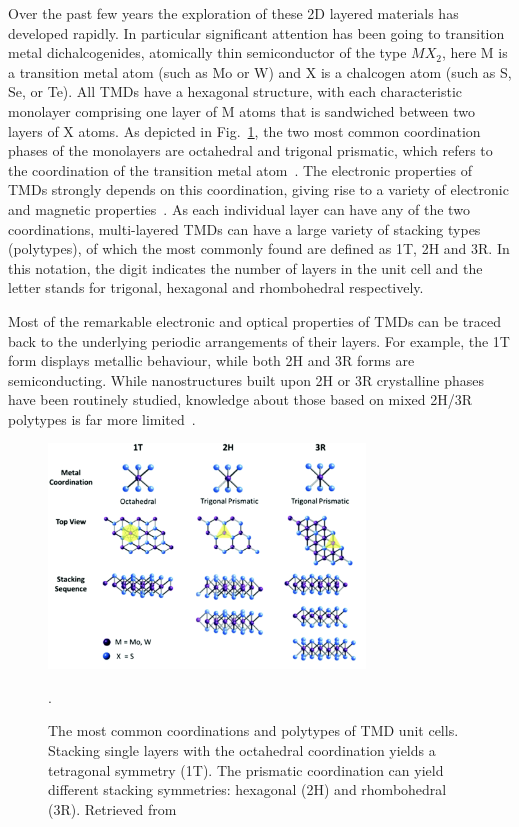 Over the past few years the exploration of these 2D layered materials
 has developed rapidly. 
 In particular significant attention has been 
 going to transition metal dichalcogenides,
 atomically thin semiconductor of the type $MX_2$, here M is a 
transition metal atom (such as Mo or W) and X is a chalcogen atom (such as S, Se, or Te). 
All TMDs have a hexagonal structure,
with each characteristic monolayer comprising one layer of M atoms 
that is sandwiched between two layers of X atoms.
%
As depicted in Fig.~\ref{fig:stackingtypes}, the two most common coordination phases of the monolayers 
are octahedral and trigonal prismatic, which refers to the coordination of the transition metal atom~\cite{Toh:2017}.
%
The electronic properties of TMDs strongly depends on this coordination,
giving rise to a variety of electronic
 and magnetic properties~\cite{Chhowalla:2013}.
As each individual layer can have any of the two coordinations, 
multi-layered TMDs can have a large variety of stacking types (polytypes), 
of which the most commonly found are defined as 1T, 2H and 3R.
%
In this notation, the digit indicates the number of layers in the unit cell and the
letter stands for trigonal, hexagonal and rhombohedral respectively.

Most of the remarkable electronic and optical properties of TMDs
can be traced back to the underlying periodic arrangements of their layers.
%
For example, the 1T form displays metallic behaviour, 
while both 2H and 3R forms are semiconducting.
%
While nanostructures built upon 2H or 3R crystalline phases have been routinely studied,
knowledge about those based on mixed 2H/3R polytypes is far more limited~\cite{SabryaWS2}.

\begin{figure}[H]
    \centering
    \includegraphics[width=0.75\textwidth]{plots/stackings.pdf}
    \caption{The most common coordinations and polytypes of TMD unit cells. 
    Stacking single layers with the  octahedral coordination yields a tetragonal symmetry (1T). 
    The prismatic coordination can yield different stacking symmetries: 
    hexagonal (2H) and rhombohedral (3R).
    Retrieved from~\cite{Toh:2017}}.
    \label{fig:stackingtypes}
\end{figure}


